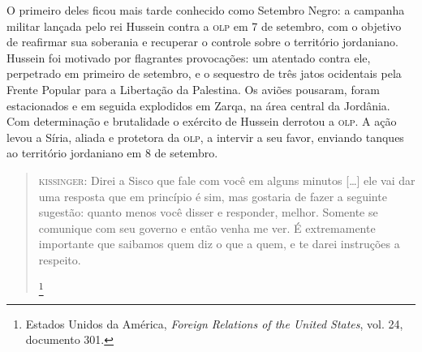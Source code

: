O primeiro deles ficou mais tarde conhecido como Setembro Negro: a
campanha militar lançada pelo rei Hussein contra a \textsc{olp} em 7 de setembro,
com o objetivo de reafirmar sua soberania e recuperar o controle sobre o
território jordaniano. Hussein foi motivado por flagrantes provocações:
um atentado contra ele, perpetrado em primeiro de setembro, e o
sequestro de três jatos ocidentais pela Frente Popular para a Libertação
da Palestina. Os aviões pousaram, foram estacionados e em seguida
explodidos em Zarqa, na área central da Jordânia. Com determinação e
brutalidade o exército de Hussein derrotou a \textsc{olp}. A ação levou a Síria,
aliada e protetora da \textsc{olp}, a intervir a seu favor, enviando tanques ao
território jordaniano em 8 de setembro.



\begin{quote}
\textsc{kissinger}: Direi a Sisco que fale com você em alguns minutos {[}\ldots{}{]} ele vai
dar uma resposta que em princípio é sim, mas gostaria de fazer a
seguinte sugestão: quanto menos você disser e responder, melhor. Somente
se comunique com seu governo e então venha me ver. É extremamente
importante que saibamos quem diz o que a quem, e te darei instruções a
respeito.

\footnote{Estados Unidos da América, \textit{Foreign Relations of the United States}, vol. 24, documento 301.}
\end{quote}

